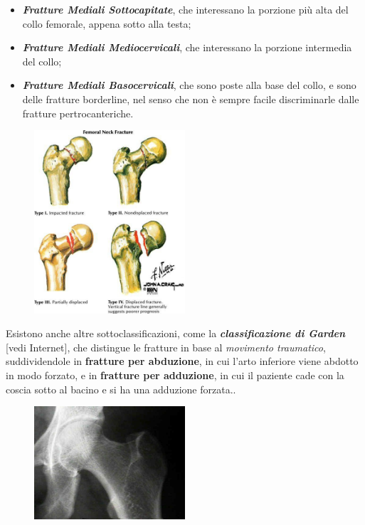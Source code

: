 \begin{itemize}
\item
  \textbf{\emph{Fratture Mediali Sottocapitate}}, che interessano la
  porzione più alta del collo femorale, appena sotto alla testa;
\item
  \textbf{\emph{Fratture Mediali Mediocervicali}}, che interessano la
  porzione intermedia del collo;
\item
  \textbf{\emph{Fratture Mediali Basocervicali}}, che sono poste alla
  base del collo, e sono delle fratture borderline, nel senso che non è
  sempre facile discriminarle dalle fratture pertrocanteriche.
\end{itemize}
\begin{figure}[!ht]
\centering
	\includegraphics[width=0.5\textwidth]{007/image5.jpeg}
\end{figure}
Esistono anche altre sottoclassificazioni, come la
\textbf{\emph{classificazione di Garden}} {[}vedi Internet{]}, che
distingue le fratture in base al \emph{movimento traumatico},
suddividendole in \textbf{fratture per abduzione}, in cui l'arto
inferiore viene abdotto in modo forzato, e in \textbf{fratture per
adduzione}, in cui il paziente cade con la coscia sotto al bacino e si
ha una adduzione forzata..
\begin{figure}[!ht]
\centering
	\includegraphics[width=0.5\textwidth]{007/image6.jpeg}
\end{figure}
